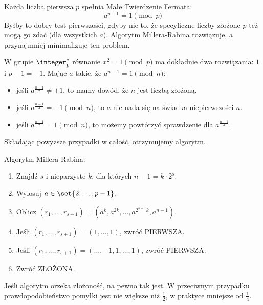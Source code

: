 Każda liczba pierwsza \( p \) spełnia Małe Twierdzenie Fermata: \[ a^{p-1} = 1 \pmod{p} \] Byłby to dobry test pierwszości, gdyby nie to, że specyficzne liczby złożone \(p\) też mogą go zdać (dla wszystkich \( a \)). Algorytm Millera-Rabina rozwiązuje, a przynajmniej minimalizuje ten problem.

W grupie \( \integer_p^{*} \) równanie \( x^2 = 1 \pmod{p} \) ma dokładnie dwa rozwiązania: \( 1 \) i \( p - 1 = -1 \).
Mając \( a \) takie, że \( a^{n-1} = 1 \pmod{n} \):
\begin{itemize}
	\item jeśli \( a^{\frac{n-1}{2}} \neq \pm 1 \), to mamy dowód, że \( n \) jest liczbą złożoną.
	\item jeśli \( a^{\frac{n-1}{2}} = -1 \pmod{n} \), to \( a \) nie nada się na świadka niepierwszości \( n \).
	\item jeśli \( a^{\frac{n-1}{2}} = 1 \pmod{n} \), to możemy powtórzyć sprawdzenie dla \( a^{\frac{n-1}{4}}\).
\end{itemize}
Składając powyższe przypadki w całość, otrzymujemy algorytm.
\begin{greyframe}
	Algorytm Millera-Rabina:
	\begin{enumerate}
		\item Znajdź \( s \) i nieparzyste \( k \), dla których \( n-1 = k \cdot 2^s \).
		\item Wylosuj \( a \in \set{2, \dots, p - 1} \).
		\item Oblicz \( (r_1, \dots, r_{s+1} ) = (a^k, a^{2k}, \dots, a^{2^{s-1}k}, a^{n-1}) \).
		\item Jeśli \( (r_1, \dots, r_{s+1}) = (1, \dots, 1) \), zwróć PIERWSZA.
		\item Jeśli \( (r_1, \dots, r_{s+1}) = (\dots, -1, 1, \dots, 1) \), zwróć PIERWSZA.
		\item Zwróć ZŁOŻONA.
	\end{enumerate}
\end{greyframe}
Jeśli algorytm orzeka złożoność, na pewno tak jest. W przeciwnym przypadku prawdopodobieństwo pomyłki jest nie większe niż \( \frac{1}{2} \), w praktyce mniejsze od \( \frac{1}{4} \).

